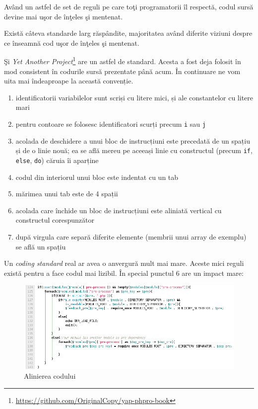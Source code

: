 Având un astfel de set de reguli pe care toţi programatorii îl respectă, codul
sursă devine mai uşor de înţeles şi mentenat.

Există câteva standarde larg răspândite, majoritatea având diferite viziuni
despre ce înseamnă {\glqq}cod uşor de înţeles şi mentenat{\grqq}.

Şi \textit{Yet Another Project}\footnote{\url{https://github.com/OriginalCopy/yap-phpro-book}}
are un astfel de standard. Acesta a fost deja folosit în mod consistent în codurile
sursă prezentate până acum. În continuare ne vom uita mai îndeaproape la această
convenție.

\begin{enumerate}
\item identificatorii variabilelor sunt scriși cu litere mici, și ale constantelor cu litere mari
\item pentru contoare se folosesc identificatori scurți precum \texttt{i} sau \texttt{j}
\item acolada de deschidere a unui bloc de instrucțiuni este precedată de un spațiu și de o linie nouă;
ea se află mereu pe aceeași linie cu constructul (precum \texttt{if}, \texttt{else}, \texttt{do}) căruia îi aparține
\item codul din interiorul unui bloc este indentat cu un tab
\item mărimea unui tab este de 4 spații
\item acolada care închide un bloc de instrucțiuni este aliniată vertical cu constructul corespunzător
\item după virgula care separă diferite elemente (membrii unui array de exemplu) se află un spațiu
\end{enumerate}

Un \textit{coding standard} real ar avea o anvergură mult mai mare. Aceste mici reguli există pentru
a face codul mai lizibil. În special punctul 6 are un impact mare:

\begin{figure}[ht!]
  \centering
    \includegraphics[scale=.5]{cap02/code_align.png}
  \caption{Alinierea codului}
  \label{fig:code_align}
\end{figure}

